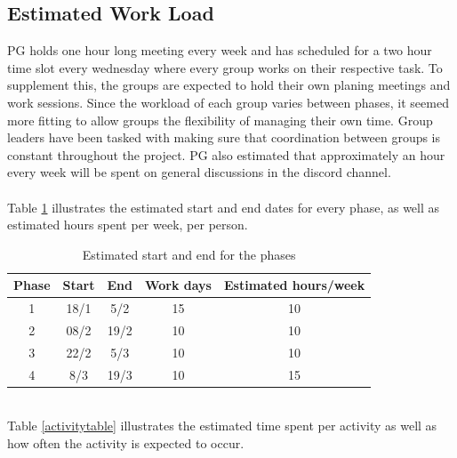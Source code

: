 \documentclass{article}
\begin{document}
    \subsection{Estimated Work Load}
        PG holds one hour long meeting every week and has scheduled for a two hour time slot every wednesday where every group works on their respective task. To supplement this, the groups are expected to hold their own planing meetings and work sessions. Since the workload of each group varies between phases, it seemed more fitting to allow groups the flexibility of managing their own time. Group leaders have been tasked with making sure that coordination between groups is constant throughout the project. PG also estimated that approximately an hour every week will be spent on general discussions in the discord channel.
        \\ \\
        Table \ref{phasetable} illustrates the estimated start and end dates 
        for every phase, as well as estimated hours spent per week, per person.
        \begin{table}[h]
            \centering
            \begin{tabular}{|c|c|c|c|c|}
                \hline
                    \textbf{Phase} & \textbf{Start} & \textbf{End} & \textbf{Work days} & 
                    \textbf{Estimated hours/week} \\
                \hline
                    1 & 18/1 & 5/2 & 15 & 10 \\
                 \hline
                    2 & 08/2 & 19/2 & 10 & 10 \\
                 \hline
                    3 & 22/2 & 5/3  & 10 & 10 \\
                 \hline
                    4 & 8/3 & 19/3  & 10 & 15 \\
                 \hline
            \end{tabular}
            \caption{Estimated start and end for the phases}
            \label{phasetable}
        \end{table}
        \\
        Table \ref{activitytable} illustrates the estimated time spent per
        activity as well as how often the activity is expected to occur.
        
\end{document}
